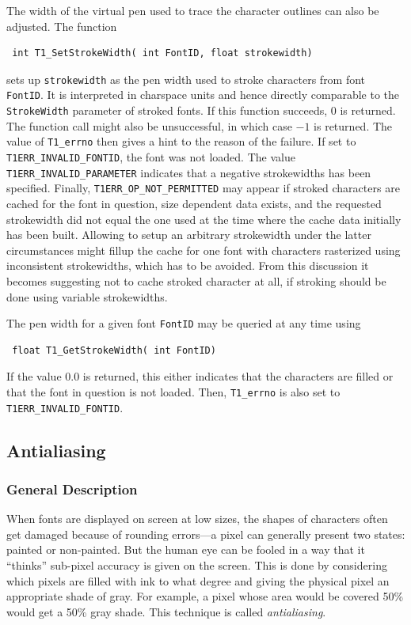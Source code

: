 The width of the virtual pen used to trace the character outlines can also be
adjusted. The function
\precorr
\begin{verbatim}
 int T1_SetStrokeWidth( int FontID, float strokewidth)
\end{verbatim}\postcorr
sets up \verb+strokewidth+ as the pen width used to stroke characters from
font \verb+FontID+. It is interpreted in charspace units and hence directly
comparable to the \verb+StrokeWidth+ parameter of stroked fonts.
If this function succeeds, $0$ is returned. The function call might
also be unsuccessful, in which case $-1$ is returned. The value of
\verb+T1_errno+ then gives a hint to the reason of the failure. If set to
\verb+T1ERR_INVALID_FONTID+, the font was not loaded. The value
\verb+T1ERR_INVALID_PARAMETER+ indicates that a negative strokewidths has
been specified. Finally, \verb+T1ERR_OP_NOT_PERMITTED+ may appear if stroked
characters are cached for the font in question, size dependent data exists,
and the requested strokewidth did not equal the one used at the time where
the cache data initially has been built. Allowing to setup an arbitrary
strokewidth under the latter circumstances might fillup the cache for one font
with characters rasterized using inconsistent strokewidths, which has to be
avoided. From this discussion it becomes suggesting not to cache stroked
character at all, if stroking should be done using variable strokewidths.

The pen width for a given font \verb+FontID+ may be queried at any time using  
\precorr
\begin{verbatim}
 float T1_GetStrokeWidth( int FontID)
\end{verbatim}\postcorr
If the value $0.0$ is returned, this either indicates that the characters are
filled or that the font in question is not loaded. Then, \verb+T1_errno+ is
also set to \verb+T1ERR_INVALID_FONTID+.
 

\subsection{Antialiasing}
\label{antialiasing}%
\subsubsection{General Description} 
When fonts are displayed on screen at low sizes, the shapes of characters often
get damaged because of rounding errors---a pixel can generally present two
states: painted or non-painted. But the human eye can be fooled in a
way that it 
``thinks'' sub-pixel accuracy is given on the screen. This is done by
considering which pixels are filled with ink to what degree and
giving the 
physical pixel an appropriate  shade of gray. For example, a pixel whose area
would be covered 50\% would get a 50\% gray shade. This technique is called
{\em antialiasing}.

